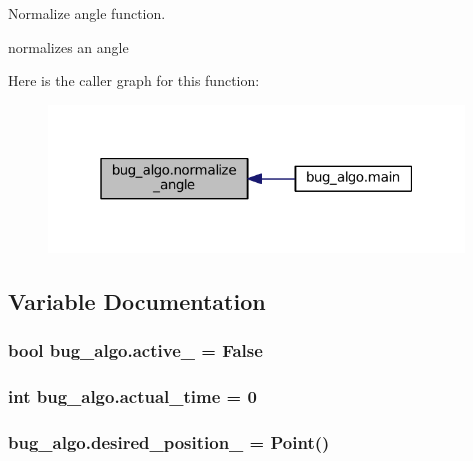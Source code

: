 Normalize angle function. 

normalizes an angle 

Here is the caller graph for this function\+:\nopagebreak
\begin{figure}[H]
\begin{center}
\leavevmode
\includegraphics[width=313pt]{namespacebug__algo_ae499da57d8d88a30b64054480fdb60c8_icgraph}
\end{center}
\end{figure}




\subsection{Variable Documentation}
\subsubsection[{\texorpdfstring{active\+\_\+}{active_}}]{\setlength{\rightskip}{0pt plus 5cm}bool bug\+\_\+algo.\+active\+\_\+ = False}\hypertarget{namespacebug__algo_a3bec537d2bfc115b0a14ee6bad41bd00}{}\label{namespacebug__algo_a3bec537d2bfc115b0a14ee6bad41bd00}
\subsubsection[{\texorpdfstring{actual\+\_\+time}{actual_time}}]{\setlength{\rightskip}{0pt plus 5cm}int bug\+\_\+algo.\+actual\+\_\+time = 0}\hypertarget{namespacebug__algo_af9e77fe7842316d1491ef585c7602710}{}\label{namespacebug__algo_af9e77fe7842316d1491ef585c7602710}
\subsubsection[{\texorpdfstring{desired\+\_\+position\+\_\+}{desired_position_}}]{\setlength{\rightskip}{0pt plus 5cm}bug\+\_\+algo.\+desired\+\_\+position\+\_\+ = Point()}\hypertarget{namespacebug__algo_a6bc76d9dd5213819c8287c8833f8f3bd}{}\label{namespacebug__algo_a6bc76d9dd5213819c8287c8833f8f3bd}
